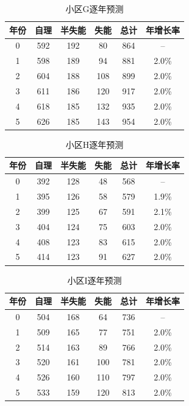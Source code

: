 \documentclass[UTF8]{ctexart}
\begin{document}
\begin{table}[H]
\centering
\caption{小区G逐年预测}
\renewcommand{\arraystretch}{1.3}
\begin{tabular}{|c|c|c|c|c|c|}
\hline
\textbf{年份} & \textbf{自理} & \textbf{半失能} & \textbf{失能} & \textbf{总计} & \textbf{年增长率} \\
\hline
0 & 592 & 192 & 80 & 864 & -- \\
\hline
1 & 598 & 189 & 94 & 881 & 2.0\% \\
\hline
2 & 604 & 188 & 108 & 899 & 2.0\% \\
\hline
3 & 611 & 186 & 120 & 917 & 2.0\% \\
\hline
4 & 618 & 185 & 132 & 935 & 2.0\% \\
\hline
5 & 626 & 185 & 143 & 954 & 2.0\% \\
\hline
\end{tabular}
\end{table}

\begin{table}[H]
\centering
\caption{小区H逐年预测}
\renewcommand{\arraystretch}{1.3}
\begin{tabular}{|c|c|c|c|c|c|}
\hline
\textbf{年份} & \textbf{自理} & \textbf{半失能} & \textbf{失能} & \textbf{总计} & \textbf{年增长率} \\
\hline
0 & 392 & 128 & 48 & 568 & -- \\
\hline
1 & 395 & 126 & 58 & 579 & 1.9\% \\
\hline
2 & 399 & 125 & 67 & 591 & 2.1\% \\
\hline
3 & 404 & 124 & 75 & 603 & 2.0\% \\
\hline
4 & 408 & 123 & 83 & 615 & 2.0\% \\
\hline
5 & 414 & 123 & 91 & 627 & 2.0\% \\
\hline
\end{tabular}
\end{table}

\begin{table}[H]
\centering
\caption{小区I逐年预测}
\renewcommand{\arraystretch}{1.3}
\begin{tabular}{|c|c|c|c|c|c|}
\hline
\textbf{年份} & \textbf{自理} & \textbf{半失能} & \textbf{失能} & \textbf{总计} & \textbf{年增长率} \\
\hline
0 & 504 & 168 & 64 & 736 & -- \\
\hline
1 & 509 & 165 & 77 & 751 & 2.0\% \\
\hline
2 & 514 & 163 & 89 & 766 & 2.0\% \\
\hline
3 & 520 & 161 & 100 & 781 & 2.0\% \\
\hline
4 & 526 & 160 & 110 & 797 & 2.0\% \\
\hline
5 & 533 & 159 & 120 & 813 & 2.0\% \\
\hline
\end{tabular}
\end{table}
\end{document}
